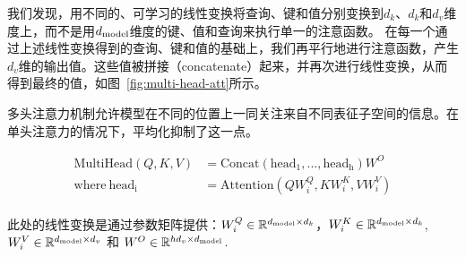 我们发现，用不同的、可学习的线性变换将查询、键和值分别变换到$d_k$、$d_k$和$d_v$维度上，而不是用$d_{\text{model}}$维度的键、值和查询来执行单一的注意函数。
在每一个通过上述线性变换得到的查询、键和值的基础上，我们再平行地进行注意函数，产生$d_v$维的输出值。这些值被拼接（concatenate）起来，并再次进行线性变换，从而得到最终的值，如图~\ref{fig:multi-head-att}所示。

多头注意力机制允许模型在不同的位置上一同关注来自不同表征子空间的信息。在单头注意力的情况下，平均化抑制了这一点。

\begin{align*}
    \mathrm{MultiHead}(Q, K, V) &= \mathrm{Concat}(\mathrm{head_1}, ..., \mathrm{head_h})W^O\\
    \text{where}~\mathrm{head_i} &= \mathrm{Attention}(QW^Q_i, KW^K_i, VW^V_i)\\
\end{align*}

此处的线性变换是通过参数矩阵提供：$W^Q_i \in \mathbb{R}^{d_{\text{model}} \times d_k}$，$W^K_i \in \mathbb{R}^{d_{\text{model}} \times d_k}$, $W^V_i \in \mathbb{R}^{d_{\text{model}} \times d_v}$ 和 $W^O \in \mathbb{R}^{hd_v \times d_{\text{model}}}$.





